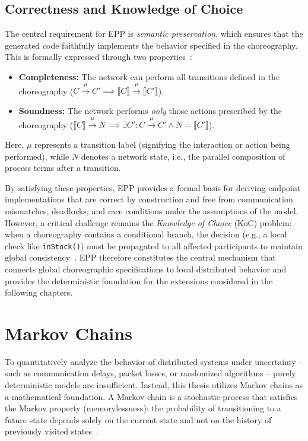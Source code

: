 \subsection*{Correctness and Knowledge of Choice}
The central requirement for EPP is \textit{semantic preservation}, which ensures that the generated code faithfully implements the behavior specified in the choreography. This is formally expressed through two properties~\cite{Carbone2012}:
\begin{itemize}
	\item \textbf{Completeness:} The network can perform all transitions defined in the choreography ($C \xrightarrow{\mu} C' \implies \llbracket C \rrbracket \xrightarrow{\mu} \llbracket C' \rrbracket$).
	\item \textbf{Soundness:} The network performs \textit{only} those actions prescribed by the choreography ($\llbracket C \rrbracket \xrightarrow{\mu} N \implies \exists C': C \xrightarrow{\mu} C' \land N = \llbracket C' \rrbracket$).
\end{itemize}
Here, $\mu$ represents a transition label (signifying the interaction or action being performed), while $N$ denotes a network state, i.e., the parallel composition of process terms after a transition.

By satisfying these properties, EPP provides a formal basis for deriving endpoint implementations that are correct by construction and free from communication mismatches, deadlocks, and race conditions under the assumptions of the model. However, a critical challenge remains the \textit{Knowledge of Choice} (KoC) problem: when a choreography contains a conditional branch, the decision (e.g., a local check like \texttt{inStock()}) must be propagated to all affected participants to maintain global consistency~\cite{Montesi2023}. EPP therefore constitutes the central mechanism that connects global choreographic specifications to local distributed behavior and provides the deterministic foundation for the extensions considered in the following chapters.


\section{Markov Chains}
To quantitatively analyze the behavior of distributed systems under uncertainty -- such as communication delays, packet losses, or randomized algorithms -- purely deterministic models are insufficient. Instead, this thesis utilizes Markov chains as a mathematical foundation. A Markov chain is a stochastic process that satisfies the Markov property (memorylessness): the probability of transitioning to a future state depends solely on the current state and not on the history of previously visited states~\cite{Norris1997MarkovChains}. 

